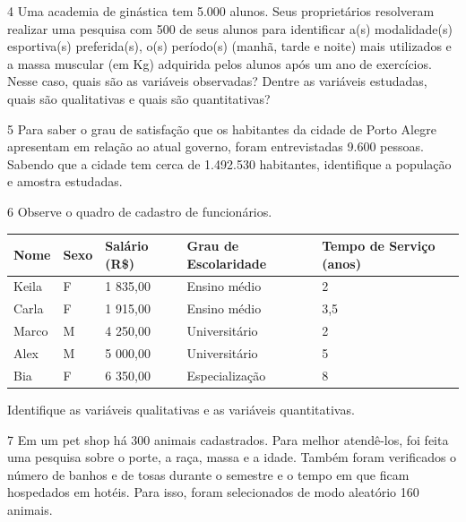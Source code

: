 \num{4} Uma academia de ginástica tem 5.000 alunos. Seus proprietários
resolveram realizar uma pesquisa com 500 de seus alunos para identificar
a(s) modalidade(s) esportiva(s) preferida(s), o(s) período(s) (manhã,
tarde e noite) mais utilizados e a massa muscular (em Kg) adquirida
pelos alunos após um ano de exercícios. Nesse caso, quais são as
variáveis observadas? Dentre as variáveis estudadas, quais são
qualitativas e quais são quantitativas?


\num{5} Para saber o grau de satisfação que os habitantes da cidade
de Porto Alegre apresentam em relação ao atual governo, foram
entrevistadas 9.600 pessoas. Sabendo que a cidade tem cerca de 1.492.530
habitantes, identifique a população e amostra estudadas.



\num{6} Observe o quadro de cadastro de
funcionários.

\begin{longtable}[]{@{}lllll@{}}
\toprule
\textbf{Nome} & \textbf{Sexo} & \textbf{Salário (R\$)} & \textbf{Grau de
Escolaridade} & \textbf{Tempo de Serviço (anos)}\tabularnewline
\midrule
\endhead
Keila & F & 1 835,00 & Ensino médio & 2\tabularnewline
Carla & F & 1 915,00 & Ensino médio & 3,5\tabularnewline
Marco & M & 4 250,00 & Universitário & 2\tabularnewline
Alex & M & 5 000,00 & Universitário & 5\tabularnewline
Bia & F & 6 350,00 & Especialização & 8\tabularnewline
\bottomrule
\end{longtable}

Identifique as variáveis qualitativas e as variáveis quantitativas.


\num{7} Em um pet shop há 300 animais cadastrados. Para melhor atendê-los,
foi feita uma pesquisa sobre o porte, a raça, massa e a idade. Também
foram verificados o número de banhos e de tosas durante o semestre e o
tempo em que ficam hospedados em hotéis. Para isso, foram selecionados
de modo aleatório 160 animais.\enlargethispage{2\baselineskip}

